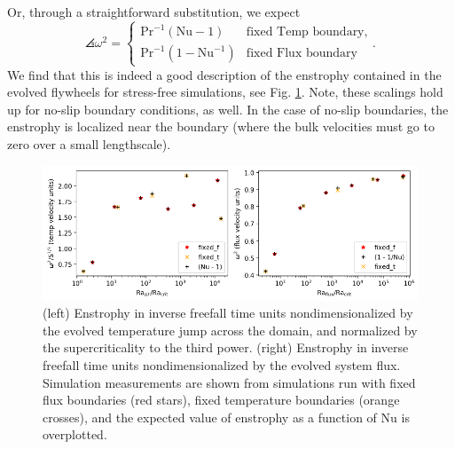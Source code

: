 Or, through a straightforward substitution, we expect
\begin{equation}
\angles{\omega^2} = 
\begin{cases}
\text{Pr}^{-1} (\text{Nu} - 1)  & \text{fixed Temp boundary}, \\
\text{Pr}^{-1} (1 - \text{Nu}^{-1}) & \text{fixed Flux boundary}
\end{cases}.
\end{equation}
We find that this is indeed a good description of the enstrophy contained in the evolved flywheels for stress-free simulations, see Fig. \ref{fig:enstrophy}.
Note, these scalings hold up for no-slip boundary conditions, as well.
In the case of no-slip boundaries, the enstrophy is localized near the boundary (where the bulk velocities must go to zero over a small lengthscale).

\begin{figure}[t!]
    \includegraphics[width=\textwidth]{figs/unpublished/enstrophy_v_ra.pdf}
    \caption{
	(left) Enstrophy in inverse freefall time units nondimensionalized by the evolved temperature jump across the domain, and normalized by the supercriticality to the third power.
	(right) Enstrophy in inverse freefall time units nondimensionalized by the evolved system flux.
	Simulation measurements are shown from simulations run with fixed flux boundaries (red stars), fixed temperature boundaries (orange crosses), and the expected value of enstrophy as a function of Nu is overplotted.
    \label{fig:enstrophy} }
\end{figure}


